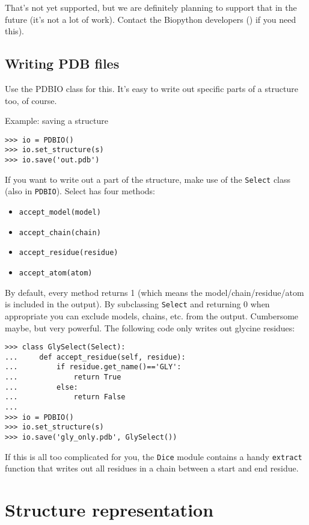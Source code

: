 That's not yet supported, but we are definitely planning to support that
in the future (it's not a lot of work). Contact the Biopython developers
() if you need this).

\subsection{Writing PDB files}

Use the PDBIO class for this. It's easy to write out specific parts
of a structure too, of course.

Example: saving a structure

\begin{verbatim}
>>> io = PDBIO()
>>> io.set_structure(s)
>>> io.save('out.pdb')
\end{verbatim}
If you want to write out a part of the structure, make use of the
\texttt{Select} class (also in \texttt{PDBIO}). Select has four methods:

\begin{itemize}
\item \verb+accept_model(model)+
\item \verb+accept_chain(chain)+
\item \verb+accept_residue(residue)+
\item \verb+accept_atom(atom)+
\end{itemize}
By default, every method returns 1 (which means the model/\-chain/\-residue/\-atom
is included in the output). By subclassing \texttt{Select} and returning
0 when appropriate you can exclude models, chains, etc. from the output.
Cumbersome maybe, but very powerful. The following code only writes
out glycine residues:

\begin{verbatim}
>>> class GlySelect(Select):
...     def accept_residue(self, residue):
...         if residue.get_name()=='GLY':
...             return True
...         else:
...             return False
...
>>> io = PDBIO()
>>> io.set_structure(s)
>>> io.save('gly_only.pdb', GlySelect())
\end{verbatim}
If this is all too complicated for you, the \texttt{Dice} module contains
a handy \texttt{extract} function that writes out all residues in
a chain between a start and end residue.

\section{Structure representation}

